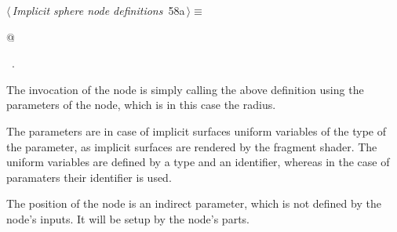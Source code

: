 \documentclass[
    a4paper,      %
    10pt,         %
    openright,    %
    notitlepage,  %
    parskip=half, %
]{scrreprt}       %
\theoremstyle{definition}                    %
\begin{document}
\begin{flushleft} \small
\begin{minipage}{\linewidth}\label{scrap93}\raggedright\small
{} $\langle\,${\itshape Implicit sphere node definitions}\nobreak\ {\footnotesize {58a}}$\,\rangle\equiv$
\vspace{-1exm}
\begin{list}{}{} \item
\mbox{}@{\NWsep}
\end{list}
\vspace{-1.5ex}
\footnotesize
\begin{list}{}{\setlength{\itemsep}{-\parsep}\setlength{\itemindent}{-\leftmargin}}
\item \NWtxtMacroRefIn\ .

\item{}
\end{list}
\end{minipage}\vspace{4ex}
\end{flushleft}
The invocation of the node is simply calling the above definition using the
parameters of the node, which is in this case the radius.

The parameters are in case of implicit surfaces uniform variables of the type
of the parameter, as implicit surfaces are rendered by the fragment shader. The
uniform variables are defined by a type and an identifier, whereas in the case
of paramaters their identifier is used.

The position of the node is an indirect parameter, which is not defined by the
node's inputs. It will be setup by the node's parts.
\end{document}
